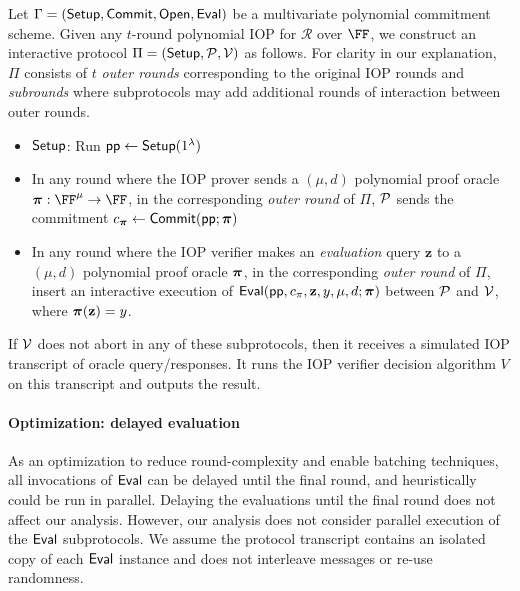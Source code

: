 Let $\Gamma = (\textsf{{Setup}}, \textsf{{Commit}}, \textsf{{Open}}, \textsf{{Eval}})$ be a multivariate polynomial commitment scheme. Given any $t$-round polynomial IOP for $\mathcal{R}$ over $\FF$, we construct an interactive protocol $\Pi = (\textsf{{Setup}}, \mathcal{P}, \mathcal{V})$ as follows. For clarity in our explanation, $\Pi$ consists of $t$ \emph{outer rounds} corresponding to the original IOP rounds and \emph{subrounds} where subprotocols may add additional rounds of interaction between outer rounds.
\begin{itemize}
\item $\textsf{{Setup}}$: Run $\textsf{pp} \leftarrow \textsf{{Setup}}(1^\lambda)$
\item In any round where the IOP prover sends a $(\mu, d)$ polynomial proof oracle $\proofO: \FF^\mu \rightarrow \FF$, in the corresponding \emph{outer round} of $\Pi$, $\mathcal{P}$ sends the commitment $c_{\boldsymbol{\pi}} \leftarrow \textsf{{Commit}}(\textsf{pp}; \boldsymbol{\pi})$
\item In any round where the IOP verifier makes an \emph{evaluation} query $\mathbf{z}$ to a $(\mu, d)$ polynomial proof oracle $\boldsymbol{\pi}$, in the corresponding \emph{outer round} of $\Pi$, insert an interactive execution of $\textsf{{Eval}}(\textsf{pp}, c_\pi, \mathbf{z}, y, \mu, d; \boldsymbol{\pi})$ between $\mathcal{P}$ and $\mathcal{V}$, where $\boldsymbol{\pi}(\mathbf{z}) = y$. 
\end{itemize}

If $\mathcal{V}$ does not abort in any of these subprotocols, then it receives a simulated IOP transcript of oracle query/responses. It runs the IOP verifier decision algorithm $V$ on this transcript and outputs the result. %

\paragraph{Optimization: delayed evaluation} As an optimization to reduce round-complexity and enable batching techniques, all invocations of $\textsf{{Eval}}$ can be delayed until the final round, and heuristically could be run in parallel. Delaying the evaluations until the final round does not affect our analysis. However, our analysis does not consider parallel execution of the $\textsf{{Eval}}$ subprotocols. We assume the protocol transcript contains an isolated copy of each $\textsf{{Eval}}$ instance and does not interleave messages or re-use randomness.

